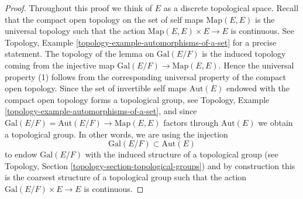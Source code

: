 \documentclass{stacks-project}
\theoremstyle{plain}
\theoremstyle{definition}
\theoremstyle{remark}
\numberwithin{equation}{subsection}
\begin{document}
\begin{proof}
Throughout this proof we think of $E$ as a discrete topological space.
Recall that the compact open topology on the set of self maps
$\text{Map}(E, E)$ is the universal topology such that the action
$\text{Map}(E, E) \times E \to E$ is continuous. See
Topology, Example \ref{topology-example-automorphisms-of-a-set}
for a precise statement. The topology of the lemma on
$\text{Gal}(E/F)$ is the induced topology coming from the
injective map $\text{Gal}(E/F) \to \text{Map}(E, E)$.
Hence the universal property (1) follows from the corresponding
universal property of the compact open topology.
Since the set of invertible self maps $\text{Aut}(E)$
endowed with the compact open topology forms a topological group, see
Topology, Example \ref{topology-example-automorphisms-of-a-set},
and since $\text{Gal}(E/F) = \text{Aut}(E/F) \to \text{Map}(E, E)$
factors through $\text{Aut}(E)$ we obtain a topological group.
In other words, we are using the injection
$$
\text{Gal}(E/F) \subset \text{Aut}(E)
$$
to endow $\text{Gal}(E/F)$ with the induced structure of a topological group
(see Topology, Section \ref{topology-section-topological-groups})
and by construction this is the coarsest structure of a topological
group such that the action $\text{Gal}(E/F) \times E \to E$ is continuous.


\end{proof}
\end{document}
